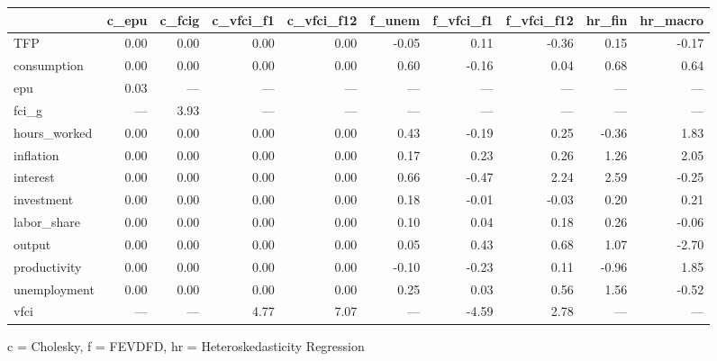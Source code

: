 
\fontsize{12.0pt}{14.4pt}\selectfont
\begin{tabular*}{\linewidth}{@{\extracolsep{\fill}}l|rrrrrrrrr}
\toprule
 & c\_epu & c\_fcig & c\_vfci\_f1 & c\_vfci\_f12 & f\_unem & f\_vfci\_f1 & f\_vfci\_f12 & hr\_fin & hr\_macro \\ 
\midrule\addlinespace[2.5pt]
TFP & 0.00 & 0.00 & 0.00 & 0.00 & -0.05 & 0.11 & -0.36 & 0.15 & -0.17 \\ 
consumption & 0.00 & 0.00 & 0.00 & 0.00 & 0.60 & -0.16 & 0.04 & 0.68 & 0.64 \\ 
epu & 0.03 & — & — & — & — & — & — & — & — \\ 
fci\_g & — & 3.93 & — & — & — & — & — & — & — \\ 
hours\_worked & 0.00 & 0.00 & 0.00 & 0.00 & 0.43 & -0.19 & 0.25 & -0.36 & 1.83 \\ 
inflation & 0.00 & 0.00 & 0.00 & 0.00 & 0.17 & 0.23 & 0.26 & 1.26 & 2.05 \\ 
interest & 0.00 & 0.00 & 0.00 & 0.00 & 0.66 & -0.47 & 2.24 & 2.59 & -0.25 \\ 
investment & 0.00 & 0.00 & 0.00 & 0.00 & 0.18 & -0.01 & -0.03 & 0.20 & 0.21 \\ 
labor\_share & 0.00 & 0.00 & 0.00 & 0.00 & 0.10 & 0.04 & 0.18 & 0.26 & -0.06 \\ 
output & 0.00 & 0.00 & 0.00 & 0.00 & 0.05 & 0.43 & 0.68 & 1.07 & -2.70 \\ 
productivity & 0.00 & 0.00 & 0.00 & 0.00 & -0.10 & -0.23 & 0.11 & -0.96 & 1.85 \\ 
unemployment & 0.00 & 0.00 & 0.00 & 0.00 & 0.25 & 0.03 & 0.56 & 1.56 & -0.52 \\ 
vfci & — & — & 4.77 & 7.07 & — & -4.59 & 2.78 & — & — \\ 
\bottomrule
\end{tabular*}
\begin{minipage}{\linewidth}
c = Cholesky, f = FEVDFD, hr = Heteroskedasticity Regression\\
\end{minipage}


